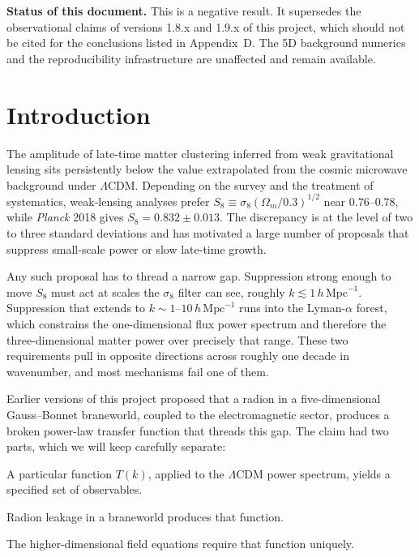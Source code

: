 \documentclass[11pt,a4paper]{article}
\newcommand{\hMpc}{h\,\mathrm{Mpc}^{-1}}
\newcommand{\LCDM}{\Lambda\mathrm{CDM}}
\newenvironment{keybox}
  {\begin{framed}\small\noindent}
  {\end{framed}}
\begin{document}
\vspace{6pt}
\begin{keybox}
\textbf{Status of this document.} This is a negative result. It supersedes the
observational claims of versions 1.8.x and 1.9.x of this project, which should not
be cited for the conclusions listed in Appendix~D. The 5D background numerics and
the reproducibility infrastructure are unaffected and remain available.
\end{keybox}

\newpage
\tableofcontents
\newpage

\section{Introduction}

The amplitude of late-time matter clustering inferred from weak gravitational
lensing sits persistently below the value extrapolated from the cosmic microwave
background under $\LCDM$. Depending on the survey and the treatment of systematics,
weak-lensing analyses prefer $S_8\equiv\sigma_8(\Omega_m/0.3)^{1/2}$ near $0.76$--$0.78$,
while \emph{Planck} 2018 gives $S_8=0.832\pm0.013$. The discrepancy is at the level
of two to three standard deviations and has motivated a large number of proposals
that suppress small-scale power or slow late-time growth.

Any such proposal has to thread a narrow gap. Suppression strong enough to move
$S_8$ must act at scales the $\sigma_8$ filter can see, roughly
$k\lesssim1\,\hMpc$. Suppression that extends to $k\sim1$--$10\,\hMpc$ runs into the
Lyman-$\alpha$ forest, which constrains the one-dimensional flux power spectrum and
therefore the three-dimensional matter power over precisely that range. These two
requirements pull in opposite directions across roughly one decade in wavenumber,
and most mechanisms fail one of them.

Earlier versions of this project proposed that a radion in a five-dimensional
Gauss--Bonnet braneworld, coupled to the electromagnetic sector, produces a broken
power-law transfer function that threads this gap. The claim had two parts, which
we will keep carefully separate:

\begin{description}[leftmargin=2.2em,style=nextline,itemsep=2pt]
\item[Layer 1 --- Phenomenology.] A particular function $T(k)$, applied to the
$\LCDM$ power spectrum, yields a specified set of observables.
\item[Layer 2 --- Mechanism.] Radion leakage in a braneworld produces that function.
\item[Layer 3 --- Derivation.] The higher-dimensional field equations require that
function uniquely.
\end{description}
\end{document}
